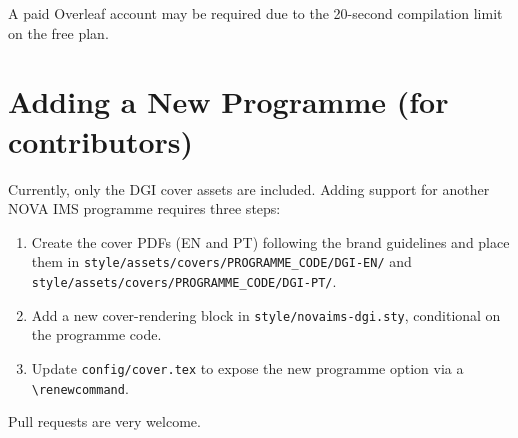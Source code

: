 A paid Overleaf account may be required due to the 20-second compilation limit
on the free plan.

\section{Adding a New Programme (for contributors)} \label{sec:newprog}

Currently, only the DGI cover assets are included.  Adding support for another
NOVA IMS programme requires three steps:

\begin{enumerate}
  \item Create the cover PDFs (EN and PT) following the brand guidelines and
        place them in \texttt{style/assets/covers/PROGRAMME\_CODE/DGI-EN/} and
        \texttt{style/assets/covers/PROGRAMME\_CODE/DGI-PT/}.
  \item Add a new cover-rendering block in \texttt{style/novaims-dgi.sty},
        conditional on the programme code.
  \item Update \texttt{config/cover.tex} to expose the new programme option via
        a \texttt{\textbackslash renewcommand}.
\end{enumerate}

Pull requests are very welcome.

